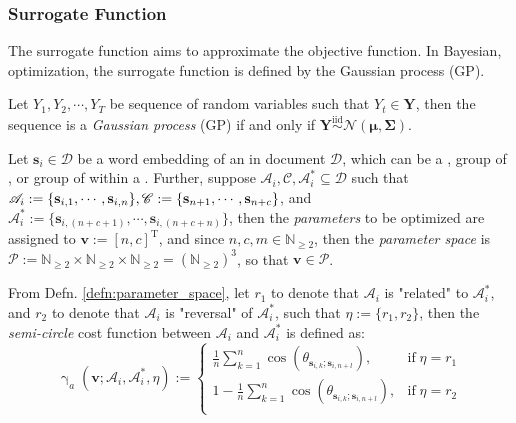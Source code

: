 \subsubsection{Surrogate Function}
The surrogate function aims to approximate the objective function. In Bayesian, optimization, the surrogate function is defined by the Gaussian process (GP).
\begin{defn}\label{defn:gp}
    Let $Y_1,Y_2,\cdots,Y_T$ be sequence of random variables such that $Y_t\in\mathbf{Y}$, then the sequence is a \textit{Gaussian process} (GP) if and only if $\mathbf{Y}\overset{\mathrm{iid}}{\sim}\mathcal{N}(\boldsymbol{\mu}, \boldsymbol{\Sigma})$.
\end{defn}
\begin{defn}\label{defn:parameter_space}
    Let $\mathbf{s}_i\in\mathscr{D}$ be a word embedding of an   in document $\mathscr{D}$, which can be a  , group of  , or group of   within a  . Further, suppose $\mathscr{A}_i,\mathscr{C},\mathscr{A}_i^{*}\subseteq\mathscr{D}$ such that $\mathscr{A}_i:=\{\mathbf{s}_{i,1},\cdots,\mathbf{s}_{i,n}\},\linebreak\mathscr{C}:=\{\mathbf{s}_{n+1},\cdots,\mathbf{s}_{n+c}\}$, and $\mathscr{A}_i^{*}:=\{\mathbf{s}_{i,(n+c+1)},\cdots,\mathbf{s}_{i,(n+c+n)}\}$, then the \textit{parameters} to be optimized are assigned to $\mathbf{v}:=[n,c]^{\text{T}}$, and since $n,c,m\in\mathbb{N}_{\geq 2}$, then the \textit{parameter space} is $\mathscr{P}:=\mathbb{N}_{\geq 2}\times\mathbb{N}_{\geq 2}\times\mathbb{N}_{\geq 2}=(\mathbb{N}_{\geq 2})^3$, so that $\mathbf{v}\in\mathscr{P}$. 
\end{defn}
\begin{defn}\label{defn:semi_circle_cost}
    From Defn. \ref{defn:parameter_space}, let $r_1$ to denote that $\mathscr{A}_i$ is "related" to $\mathscr{A}_i^{*}$, and $r_2$ to denote that $\mathscr{A}_i$ is "reversal" of $\mathscr{A}_i^{*}$, such that $\eta:=\{r_1,r_2\}$, then  the \textit{semi-circle} cost function between $\mathscr{A}_i$ and $\mathscr{A}_i^{*}$ is defined as:
    \begin{equation}
        \operatorname{\gamma}_{a}(\mathbf{v};\mathscr{A}_i,\mathscr{A}_i^{*},\eta):=\begin{cases}
            \frac{1}{n}\sum_{k=1}^{n}\cos\left(\theta_{\mathbf{s}_{i,k};\mathbf{s}_{i,n+l}}\right),&\text{if}\;\eta=r_1\\
            1-\frac{1}{n}\sum_{k=1}^{n}\cos\left(\theta_{\mathbf{s}_{i,k};\mathbf{s}_{i,n+l}}\right),&\text{if}\;\eta=r_2\\
        \end{cases}
    \end{equation}
\end{defn}
